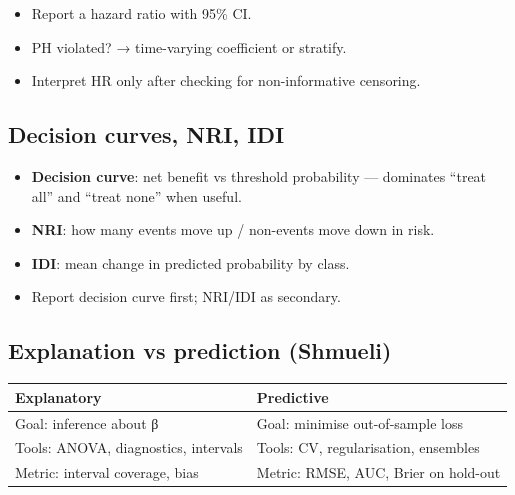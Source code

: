 \documentclass[
]{article}
\newcounter{none} %
\providecommand{\tightlist}{%
  \setlength{\itemsep}{0pt}\setlength{\parskip}{0pt}}
\begin{document}
\begin{itemize}
\tightlist
\item
  Report a hazard ratio with 95\% CI.
\item
  PH violated? → time-varying coefficient or stratify.
\item
  Interpret HR only after checking for non-informative censoring.
\end{itemize}

\subsection{Decision curves, NRI, IDI}\label{decision-curves-nri-idi}

\begin{itemize}
\tightlist
\item
  \textbf{Decision curve}: net benefit vs threshold probability ---
  dominates ``treat all'' and ``treat none'' when useful.
\item
  \textbf{NRI}: how many events move up / non-events move down in risk.
\item
  \textbf{IDI}: mean change in predicted probability by class.
\item
  Report decision curve first; NRI/IDI as secondary.
\end{itemize}

\subsection{Explanation vs prediction
(Shmueli)}\label{explanation-vs-prediction-shmueli}

{\def\LTcaptype{none} %
\begin{longtable}[]{@{}
  >{\raggedright\arraybackslash}p{}
  >{\raggedright\arraybackslash}p{}@{}}
\toprule\noalign{}
\begin{minipage}[b]{\linewidth}\raggedright
Explanatory
\end{minipage} & \begin{minipage}[b]{\linewidth}\raggedright
Predictive
\end{minipage} \\
\midrule\noalign{}
\endhead
\bottomrule\noalign{}
\endlastfoot
Goal: inference about β & Goal: minimise out-of-sample loss \\
Tools: ANOVA, diagnostics, intervals & Tools: CV, regularisation,
ensembles \\
Metric: interval coverage, bias & Metric: RMSE, AUC, Brier on
hold-out \\
\end{longtable}
}
\end{document}
